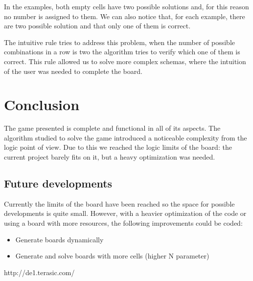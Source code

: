 \documentclass[12pt]{report}
\begin{document}
In the examples, both empty cells have two possible solutions and, for this
reason no number is assigned to them. We can also notice that, for each
example, there are two possible solution and that only one of them is
correct.

The intuitive rule tries to address this problem, when the number of
possible combinations in a row is two the algorithm tries to verify which
one of them is correct. This rule allowed us to solve more complex
schemas, where the intuition of the user was needed to complete the board.

\chapter*{Conclusion}

The game presented is complete and functional in all of its aspects. The
algorithm studied to solve the game introduced a noticeable complexity
from the logic point of view. Due to this we reached the logic limits of
the board: the current project barely fits on it, but a heavy optimization
was needed.

\section*{Future developments}

Currently the limits of the board have been reached so the space for
possible developments is quite small. However, with a heavier optimization
of the code or using a board with more resources, the following improvements
could be coded:

\begin{itemize}

    \item Generate boards dynamically
    \item Generate and solve boards with more cells (higher N parameter)

\end{itemize}

\renewcommand{\bibname}{References}
\begin{thebibliography}{100}

 http://de1.terasic.com/

\end{thebibliography}
\end{document}
